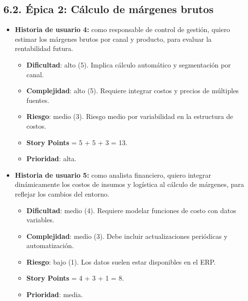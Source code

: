 \documentclass[
11pt, %
]{charter}
\begin{document}
\subsection*{6.2. Épica 2: Cálculo de márgenes brutos}
\begin{itemize}
  \item \textbf{Historia de usuario 4:} como responsable de control de gestión, quiero estimar los márgenes brutos por canal y producto, para evaluar la rentabilidad futura.
    \begin{itemize}
      \item \textbf{Dificultad}: alto (5). Implica cálculo automático y segmentación por canal.
      \item \textbf{Complejidad}: alto (5). Requiere integrar costos y precios de múltiples fuentes.
      \item \textbf{Riesgo}: medio (3). Riesgo medio por variabilidad en la estructura de costos.
      \item \textbf{Story Points} = 5 + 5 + 3 = 13.
      \item \textbf{Prioridad}: alta.
    \end{itemize}
  \item \textbf{Historia de usuario 5:} como analista financiero, quiero integrar dinámicamente los costos de insumos y logística al cálculo de márgenes, para reflejar los cambios del entorno.
    \begin{itemize}
      \item \textbf{Dificultad}: medio (4). Requiere modelar funciones de costo con datos variables.
      \item \textbf{Complejidad}: medio (3). Debe incluir actualizaciones periódicas y automatización.
      \item \textbf{Riesgo}: bajo (1). Los datos suelen estar disponibles en el ERP.
      \item \textbf{Story Points} = 4 + 3 + 1 = 8.
      \item \textbf{Prioridad}: media.
    \end{itemize}
\end{itemize}
\end{document}
